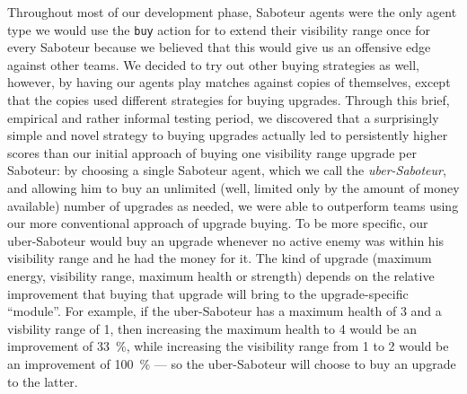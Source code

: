 \begin{description}
        Throughout most of our development phase, Saboteur agents were the only agent type we would use the \texttt{buy} action for to extend their visibility range once for every Saboteur because we believed that this would give us an offensive edge against other teams.
        We decided to try out other buying strategies as well, however, by having our agents play matches against copies of themselves, except that the copies used different strategies for buying upgrades.
        Through this brief, empirical and rather informal testing period, we discovered that a surprisingly simple and novel strategy to buying upgrades actually led to persistently higher scores than our initial approach of buying one visibility range upgrade per Saboteur: by choosing a single Saboteur agent, which we call the \emph{uber-Saboteur}, and allowing him to buy an unlimited (well, limited only by the amount of money available) number of upgrades as needed, we were able to outperform teams using our more conventional approach of upgrade buying.
        To be more specific, our uber-Saboteur would buy an upgrade whenever no active enemy was within his visibility range and he had the money for it.
        The kind of upgrade (maximum energy, visibility range, maximum health or strength) depends on the relative improvement that buying that upgrade will bring to the upgrade-specific \enquote{module}.
        For example, if the uber-Saboteur has a maximum health of 3 and a visbility range of 1, then increasing the maximum health to 4 would be an improvement of \SI{33}{\percent}, while increasing the visibility range from 1 to 2 would be an improvement of \SI{100}{\percent} --- so the uber-Saboteur will choose to buy an upgrade to the latter.
        

\end{description}
